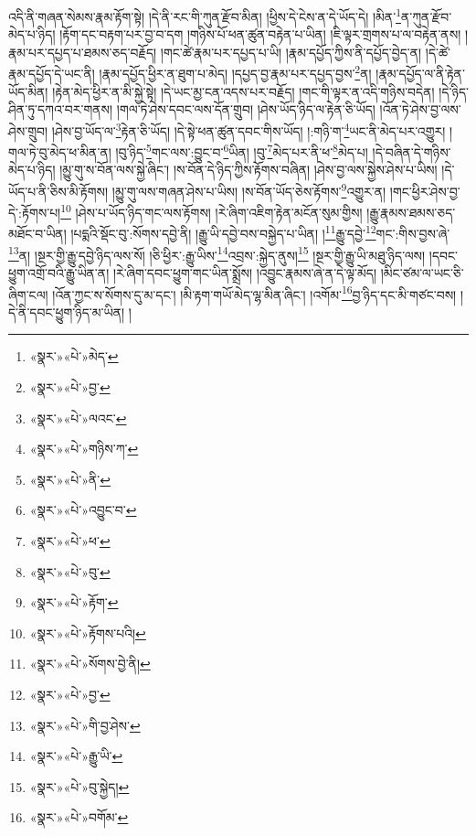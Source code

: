 འདི་ནི་གཞན་སེམས་རྣམ་རྟོག་སྟེ། །དེ་ནི་རང་གི་ཀུན་རྫོབ་མིན། །ཕྱིས་དེ་ངེས་ན་དེ་ཡོད་དེ། །མིན་\footnote{«སྣར་»«པེ་»མེད་}ན་ཀུན་རྫོབ་མེད་པ་ཉིད། །རྟོག་དང་བརྟག་པར་བྱ་བ་དག །གཉིས་པོ་ཕན་ཚུན་བརྟེན་པ་ཡིན། །ཇི་ལྟར་གྲགས་པ་ལ་བརྟེན་ནས། །རྣམ་པར་དཔྱད་པ་ཐམས་ཅད་བརྗོད། །གང་ཚེ་རྣམ་པར་དཔྱད་པ་ཡི། །རྣམ་དཔྱོད་ཀྱིས་ནི་དཔྱོད་བྱེད་ན། །དེ་ཚེ་རྣམ་དཔྱོད་དེ་ཡང་ནི། །རྣམ་དཔྱོད་ཕྱིར་ན་ཐུག་པ་མེད། །དཔྱད་བྱ་རྣམ་པར་དཔྱད་བྱས་\footnote{«སྣར་»«པེ་»བྱ་}ན། །རྣམ་དཔྱོད་ལ་ནི་རྟེན་ཡོད་མིན། །རྟེན་མེད་ཕྱིར་ན་མི་སྐྱེ་སྟེ། །དེ་ཡང་མྱ་ངན་འདས་པར་བརྗོད། །གང་གི་ལྟར་ན་འདི་གཉིས་བདེན། །དེ་ཉིད་ཤིན་ཏུ་དཀའ་བར་གནས། །གལ་ཏེ་ཤེས་དབང་ལས་དོན་གྲུབ། །ཤེས་ཡོད་ཉིད་ལ་རྟེན་ཅི་ཡོད། །འོན་ཏེ་ཤེས་བྱ་ལས་ཤེས་གྲུབ། །ཤེས་བྱ་ཡོད་ལ་\footnote{«སྣར་»«པེ་»ལའང་}རྟེན་ཅི་ཡོད། །དེ་སྟེ་ཕན་ཚུན་དབང་གིས་ཡོད། །:གཉི་ག་\footnote{«སྣར་»«པེ་»གཉིས་ཀ་}ཡང་ནི་མེད་པར་འགྱུར། །གལ་ཏེ་བུ་མེད་ཕ་མིན་ན། །བུ་ཉིད་\footnote{«སྣར་»«པེ་»ནི་}གང་ལས་:བྱུང་བ་\footnote{«སྣར་»«པེ་»འབྱུང་བ་}ཡིན། །བུ་\footnote{«སྣར་»«པེ་»ཕ་}མེད་པར་ནི་ཕ་\footnote{«སྣར་»«པེ་»བུ་}མེད་པ། །དེ་བཞིན་དེ་གཉིས་མེད་པ་ཉིད། །མྱུ་གུ་ས་བོན་ལས་སྐྱེ་ཞིང་། །ས་བོན་དེ་ཉིད་ཀྱིས་རྟོགས་བཞིན། །ཤེས་བྱ་ལས་སྐྱེས་ཤེས་པ་ཡིས། །དེ་ཡོད་པ་ནི་ཅིས་མི་རྟོགས། །མྱུ་གུ་ལས་གཞན་ཤེས་པ་ཡིས། །ས་བོན་ཡོད་ཅེས་རྟོགས་\footnote{«སྣར་»«པེ་»རྟོག་}འགྱུར་ན། །གང་ཕྱིར་ཤེས་བྱ་དེ་:རྟོགས་པ།\footnote{«སྣར་»«པེ་»རྟོགས་པའི།} །ཤེས་པ་ཡོད་ཉིད་གང་ལས་རྟོགས། །རེ་ཞིག་འཇིག་རྟེན་མངོན་སུམ་གྱིས། །རྒྱུ་རྣམས་ཐམས་ཅད་མཐོང་བ་ཡིན། །པདྨའི་སྡོང་བུ་:སོགས་དབྱེ་ནི། །རྒྱུ་ཡི་དབྱེ་བས་བསྐྱེད་པ་ཡིན། །\footnote{«སྣར་»«པེ་»སོགས་བྱེ་ནི། }རྒྱུ་དབྱེ་\footnote{«སྣར་»«པེ་»བྱ་}གང་:གིས་བྱས་ཞེ་\footnote{«སྣར་»«པེ་»གི་བྱ་ཤེས་}ན། །སྔར་གྱི་རྒྱུ་དབྱེ་ཉིད་ལས་སོ། །ཅི་ཕྱིར་:རྒྱུ་ཡིས་\footnote{«སྣར་»«པེ་»རྒྱུ་ཡི་}འབྲས་:སྐྱེད་ནུས།\footnote{«སྣར་»«པེ་»བུ་སྐྱེད།} །སྔར་གྱི་རྒྱུ་ཡི་མཐུ་ཉིད་ལས། །དབང་ཕྱུག་འགྲོ་བའི་རྒྱུ་ཡིན་ན། །རེ་ཞིག་དབང་ཕྱུག་གང་ཡིན་སྨྲོས། །འབྱུང་རྣམས་ཞེ་ན་དེ་ལྟ་མོད། །མིང་ཙམ་ལ་ཡང་ཅི་ཞིག་ངལ། །འོན་ཀྱང་ས་སོགས་དུ་མ་དང་། །མི་རྟག་གཡོ་མེད་ལྷ་མིན་ཞིང་། །འགོམ་\footnote{«སྣར་»«པེ་»བགོམ་}བྱ་ཉིད་དང་མི་གཙང་བས། །དེ་ནི་དབང་ཕྱུག་ཉིད་མ་ཡིན། །
